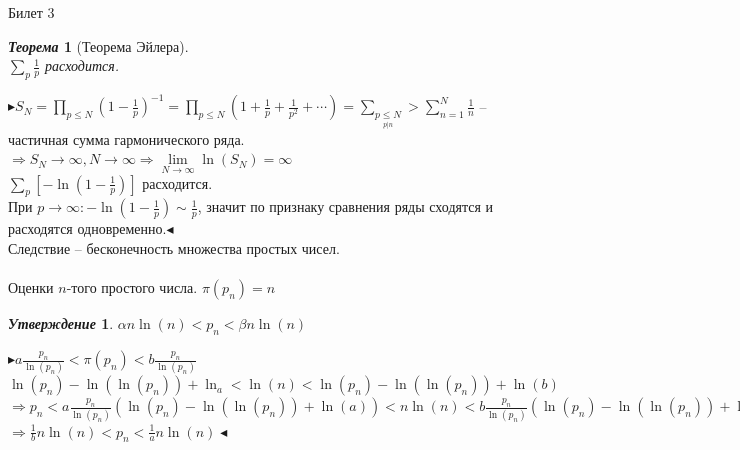 \documentclass[a4paper,12pt]{article}
\newtheorem{teo}{\textit{Теорема}}
\newtheorem{utv}{\textit{Утверждение}}
\newcommand{\q}{\quad}
\newcommand{\pb}{\blacktriangleright}
\newcommand{\pe}{\blacktriangleleft}
\newcommand{\Ra}{\Rightarrow}
\newcommand{\SL}{\sum\limits}
\newcommand{\os}{\left(}
\newcommand{\cs}{\right)}
\begin{document}
\begin{mybox}{\hypertarget{bil3}{Билет 3}}
\begin{teo}[Теорема Эйлера]\q\\$\sum_p \frac{1}{p}$ расходится.
\end{teo}
$\pb S_N = \prod\limits_{p \le N} (1 - \frac{1}{p})^{-1} = \prod\limits_{p \le N} \os 1 + \frac{1}{p} + \frac{1}{p^2} + \cdots\cs = \SL_{\underset{ p|n}{p \le N}} > \SL_{n=1}^N\frac{1}{n}$ -- частичная сумма гармонического ряда.\\
$\Ra S_N\to \infty, N\to\infty\Ra \lim\limits_{N\to\infty}\ln(S_N) = \infty$\\
$\SL_p[-\ln(1-\frac{1}{p})]$ расходится.\\
При $p\to\infty: -\ln(1-\frac{1}{p}) \sim \frac{1}{p}$, значит по признаку сравнения ряды сходятся и расходятся одновременно.$\pe$\\
Следствие -- бесконечность множества простых чисел.\\\q\\
Оценки $n$-того простого числа. $\pi(p_n) = n$\\
\begin{utv} $\alpha n \ln(n) < p_n < \beta n \ln(n)   $
\end{utv}
$\pb a \frac{p_n}{\ln(p_n)} < \pi(p_n) < b \frac{p_n}{\ln(p_n)} $\\
$\ln(p_n)  -\ln(\ln(p_n)) + \ln_a < \ln(n) < \ln (p_n) - \ln(\ln(p_n)) + \ln(b)  $\\
$\Ra p_n < a \frac{p_n}{\ln(p_n)} (\ln(p_n) - \ln(\ln(p_n)) + \ln(a))   < n \ln(n) <  b \frac{p_n}{\ln(p_n)} (\ln(p_n) - \ln(\ln(p_n)) + \ln(b))$\\$ \Ra \frac{1}{b} n \ln(n) < p_n < \frac{1}{a}n \ln(n)\pe $

\end{mybox}
\end{document}
